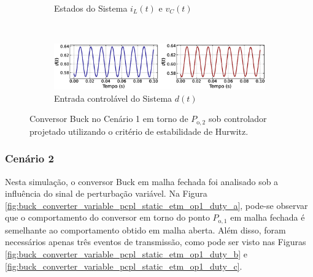 \begin{figure}[H]
\begin{subfigure}{1.\textwidth}
    \caption{Estados do Sistema $i_L(t)$  e $v_C(t)$}
  \end{subfigure}
  \\[6pt]
  \begin{subfigure}{1.\textwidth}
    \centering
    \includegraphics[width=1.\textwidth]{figuras/classic/buck/sim1/op2/duty-cycle.eps}
    \caption{Entrada controlável do Sistema $d(t)$}
  \end{subfigure}
  \caption{Conversor Buck no Cenário 1 em torno de $P_{\mathrm{o}, 2}$ sob controlador projetado utilizando o critério de estabilidade de Hurwitz.}
  \label{fig:classic_buck_cen1_op2}
\end{figure}

\subsubsection{Cenário 2}

Nesta simulação, o conversor Buck em malha fechada foi analisado sob a influência do sinal de perturbação variável. Na Figura \ref{fig:buck_converter_variable_pcpl_static_etm_op1_duty_a}, pode-se observar que o comportamento do conversor em torno do ponto $P_{\mathrm{o}, 1}$ em malha fechada é semelhante ao comportamento obtido em malha aberta. Além disso, foram necessários apenas três eventos de transmissão, como pode ser visto nas Figuras \ref{fig:buck_converter_variable_pcpl_static_etm_op1_duty_b} e \ref{fig:buck_converter_variable_pcpl_static_etm_op1_duty_c}.

